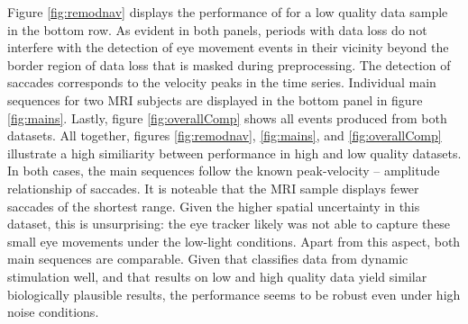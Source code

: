    Figure \ref{fig:remodnav} displays the performance of \remodnav for a low quality data sample in the bottom row.
    As evident in both panels, periods with data loss do not interfere with the detection of eye movement events in
    their vicinity beyond the border region of data loss that is masked during preprocessing. The detection of
    saccades corresponds to the velocity peaks in the time series. Individual main sequences for two MRI subjects are
    displayed in the bottom panel in figure \ref{fig:mains}. Lastly, figure \ref{fig:overallComp} shows all events
    produced from both datasets. All together, figures \ref{fig:remodnav}, \ref{fig:mains}, and \ref{fig:overallComp}
    illustrate a high similiarity between performance in high and low quality datasets. In both cases, the main
    sequences follow the known peak-velocity -- amplitude relationship of saccades. It is noteable that the MRI
    sample displays fewer saccades of the shortest range. Given the higher spatial uncertainty in this dataset, this
    is unsurprising: the eye tracker likely was not able to capture these small eye movements under the low-light
    conditions. Apart from this aspect, both main sequences are comparable. Given that \remodnav classifies data from
    dynamic stimulation well, and that results on low and high quality data yield similar biologically plausible
    results, the performance seems to be robust even under high noise conditions.

